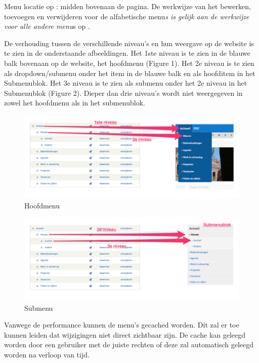 Menu locatie op \drupalpath{}: midden bovenaan de pagina. De werkwijze van het bewerken, toevoegen en verwijderen voor de alfabetische menu\emph{s is gelijk aan de werkwijze voor alle andere menu}s op \drupalpath{}. 

De verhouding tussen de verschillende niveau's en hun weergave op de website is te zien in de onderstaande afbeeldingen. Het 1ste niveau is te zien in de blauwe balk bovenaan op de website, het hoofdmenu (Figure 1). Het 2e niveau is te zien als dropdown/submenu onder het item in de blauwe balk en als hoofditem in het Submenublok. Het 3e niveau is te zien als submenu onder het 2e niveau in het Submenublok (Figure 2). Dieper dan drie niveau's wordt niet weergegeven in zowel het hoofdmenu als in het submenublok.

\begin{figure}[h!]
  \includegraphics[width=\textwidth]{img/menu_mainmenu.png}
  \caption{Hoofdmenu}
\end{figure}

\begin{figure}[h!]
  \includegraphics[width=\textwidth]{img/menu_submenu.png}
  \caption{Submenu}
\end{figure}

\bigskip

Vanwege de performance kunnen de menu's gecached worden. Dit zal er toe kunnen leiden dat wijzigingen niet direct zichtbaar zijn. De cache kan geleegd worden door een gebruiker met de juiste rechten of deze zal automatisch geleegd worden na verloop van tijd.

